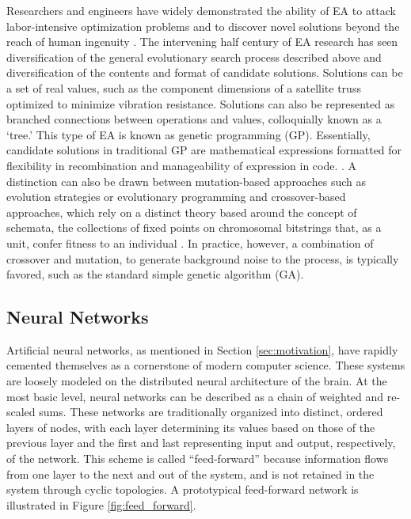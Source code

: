 Researchers and engineers have widely demonstrated the ability of EA to attack labor-intensive optimization problems and to discover novel solutions beyond the reach of human ingenuity \cite{Poli2008AProgramming}. The intervening half century of EA research has seen diversification of the general evolutionary search process described above and diversification of the contents and format of candidate solutions. Solutions can be a set of real values, such as the component dimensions of a satellite truss optimized to minimize vibration resistance. Solutions can also be represented as branched connections between operations and values, colloquially known as a ‘tree.’ This type of EA is known as genetic programming (GP). Essentially, candidate solutions in traditional GP are mathematical expressions formatted for flexibility in recombination and manageability of expression in code. \cite{Poli2008AProgramming}. A distinction can also be drawn between mutation-based approaches such as evolution strategies or evolutionary programming and crossover-based approaches, which rely on a distinct theory based around the concept of schemata, the collections of fixed points on chromosomal bitstrings that, as a unit, confer fitness to an individual \cite{2006RepresentationsAlgorithms}. In practice, however, a combination of crossover and mutation, to generate background noise to the process, is typically favored, such as the standard simple genetic algorithm (GA).

\subsection{Neural Networks}

Artificial neural networks, as mentioned in Section \ref{sec:motivation}, have rapidly cemented themselves as a cornerstone of modern computer science. These systems are loosely modeled on the distributed neural architecture of the brain. At the most basic level, neural networks can be described as a chain of weighted and re-scaled sums. These networks are traditionally organized into distinct, ordered layers of nodes, with each layer determining its values based on those of the previous layer and the first and last representing input and output, respectively, of the network. This scheme is called ``feed-forward'' because information flows from one layer to the next and out of the system, and is not retained in the system through cyclic topologies. A prototypical feed-forward network is illustrated in Figure \ref{fig:feed_forward}.

